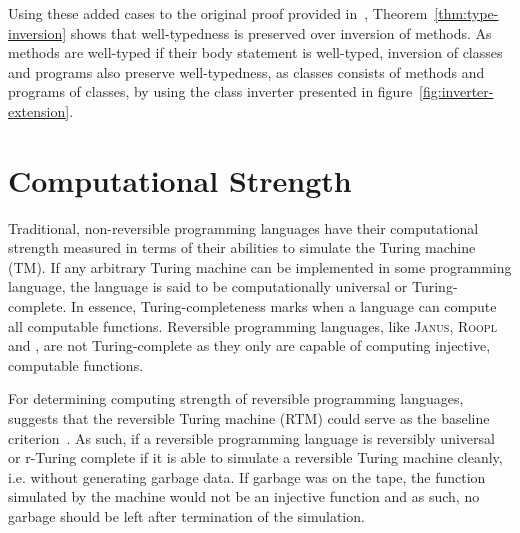 Using these added cases to the original proof provided in~\cite{th:roopl}, Theorem~\ref{thm:type-inversion} shows that well-typedness is preserved over inversion of \rooplpp methods. As methods are well-typed if their body statement is well-typed, inversion of classes and programs also preserve well-typedness, as classes consists of methods and programs of classes, by using the class inverter presented in figure~\ref{fig:inverter-extension}.  


\section{Computational Strength}
\label{sec:computational-strength}
Traditional, non-reversible programming languages have their computational strength measured in terms of their abilities to simulate the Turing machine (TM). If any arbitrary Turing machine can be implemented in some programming language, the language is said to be computationally universal or Turing-complete. In essence, Turing-completeness marks when a language can compute all computable functions. Reversible programming languages, like \textsc{Janus}, \textsc{Roopl} and \rooplpp, are not Turing-complete as they only are capable of computing injective, computable functions.

For determining computing strength of reversible programming languages,~\citeauthor{ty:ejanus} suggests that the reversible Turing machine (RTM) could serve as the baseline criterion~\cite{ty:ejanus}. As such, if a reversible programming language is reversibly universal or r-Turing complete if it is able to simulate a reversible Turing machine cleanly, i.e. without generating garbage data. If garbage was on the tape, the function simulated by the machine would not be an injective function and as such, no garbage should be left after termination of the simulation.

